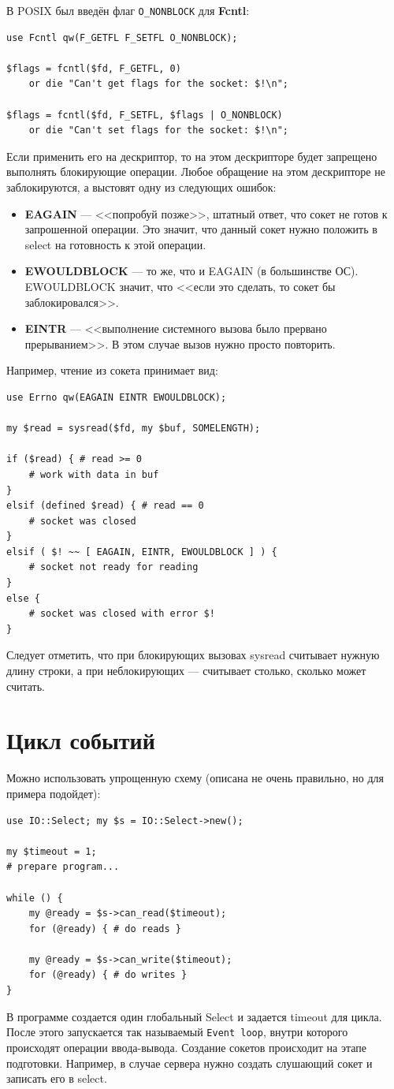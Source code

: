 В POSIX был введён флаг \verb|O_NONBLOCK| для \textbf{Fcntl}:
\begin{verbatim}
use Fcntl qw(F_GETFL F_SETFL O_NONBLOCK);

$flags = fcntl($fd, F_GETFL, 0)
    or die "Can't get flags for the socket: $!\n";

$flags = fcntl($fd, F_SETFL, $flags | O_NONBLOCK)
    or die "Can't set flags for the socket: $!\n";
\end{verbatim}
Если применить его на дескриптор, то на этом дескрипторе будет запрещено выполнять блокирующие операции. Любое обращение на этом дескрипторе не заблокируются, а выстовят одну из следующих ошибок:
\begin{itemize}
  \item \textbf{EAGAIN} --- <<попробуй позже>>, штатный ответ, что сокет не готов к запрошенной операции. Это значит, что данный сокет нужно положить в  select на готовность к этой операции.
  \item \textbf{EWOULDBLOCK} --- то же, что и EAGAIN (в большинстве ОС). EWOULDBLOCK значит, что <<если это сделать, то сокет бы заблокировался>>.
  \item \textbf{EINTR} --- <<выполнение системного вызова было прервано прерыванием>>. В этом случае вызов нужно просто повторить.
\end{itemize}
Например, чтение из сокета принимает вид:
\begin{verbatim}
use Errno qw(EAGAIN EINTR EWOULDBLOCK);

my $read = sysread($fd, my $buf, SOMELENGTH);

if ($read) { # read >= 0
    # work with data in buf
}
elsif (defined $read) { # read == 0
    # socket was closed
}
elsif ( $! ~~ [ EAGAIN, EINTR, EWOULDBLOCK ] ) {
    # socket not ready for reading
}
else {
    # socket was closed with error $!
}
\end{verbatim}
Следует отметить, что при блокирующих вызовах sysread считывает нужную длину строки, а при неблокирующих --- считывает столько, сколько может считать.

\section{Цикл событий}
Можно использовать упрощенную схему (описана не очень правильно, но для примера подойдет):
\begin{verbatim}
use IO::Select; my $s = IO::Select->new();

my $timeout = 1;
# prepare program...

while () {
    my @ready = $s->can_read($timeout);
    for (@ready) { # do reads }

    my @ready = $s->can_write($timeout);
    for (@ready) { # do writes }
}
\end{verbatim}
В программе создается один глобальный Select и задается timeout для цикла. После этого запускается так называемый \verb|Event loop|, внутри которого происходят операции ввода-вывода. Создание сокетов происходит на этапе подготовки. Например, в случае сервера нужно создать слушающий сокет и записать его в select.

